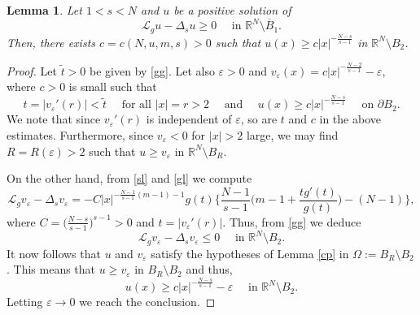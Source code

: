 \documentclass[leqno,12pt]{article}
\numberwithin{equation}{section}
\newcommand{\R}{\mathbb R}
\newcommand{\Ro}{\mathbb R^N\setminus \overline B_1}
\newcommand{\Lg}{{\mathcal L}_g}
\newtheorem{lemma}[theorem]{Lemma}
\begin{document}
\begin{lemma}\label{ls}
Let $1<s<N$ and $u$ be a positive solution of 
$$
\Lg u-\Delta_s u\geq 0\quad\mbox{ in }\Ro.
$$ 
Then, there exists $c=c(N, u, m,s)>0$ such that $u(x)\geq c|x|^{-\frac{N-s}{s-1}}$ in $\R^N\setminus B_{2}$.
\end{lemma}
\begin{proof} Let $\tilde t>0$ be given by \eqref{gg}. 
Let also $\varepsilon>0$ and $v_\varepsilon(x)=c|x|^{-\frac{N-2}{s-1}}-\varepsilon$, where $c>0$ is small such that
$$
t=|v_\varepsilon'(r)|<\tilde t\quad\mbox{ for all }|x|=r>2\quad \mbox{ and  }\quad u(x)\geq c|x|^{-\frac{N-s}{s-1}} \quad\mbox{ on }\partial B_{2}.
$$
We note that since $v_\varepsilon'(r)$ is independent of $\varepsilon$, so are $t$ and $c$ in the above estimates.
Furthermore, since $v_\varepsilon<0$ for $|x|>2$ large, we may find $R=R(\varepsilon)>2$ such that $u\geq v_\varepsilon$ in $\R^N\setminus B_R$. 

On the other hand, from \eqref{sl} and \eqref{gl}  we compute
$$
\Lg v_\varepsilon-\Delta_s v_\varepsilon=-C|x|^{-\frac{N-1}{s-1}(m-1)-1}g(t)\Big\{\frac{N-1}{s-1}\Big(m-1+\frac{tg'(t)}{g(t)}\Big)-(N-1)\Big\},
$$
where $C=\Big(\frac{N-s}{s-1}\Big)^{s-1}>0$ and $t=|v_\varepsilon'(r)|$. Thus, from \eqref{gg} we deduce 
$$
\Lg v_\varepsilon-\Delta_s v_\varepsilon\leq 0\quad\mbox{ in }\R^N\setminus B_2.
$$ 
It now follows that $u$ and $v_\varepsilon$ satisfy the hypotheses of Lemma \ref{cp} in $\Omega:=B_R\setminus B_2$. This means that $u\geq v_\varepsilon$ in $B_R\setminus B_2$ and thus,
$$
u(x)\geq  c|x|^{-\frac{N-s}{s-1}}-\varepsilon\quad\mbox{ in }\R^N\setminus B_2.
$$ 
Letting $\varepsilon\to 0$ we reach the conclusion.
\end{proof}
\end{document}
